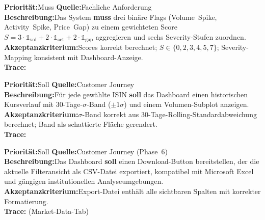\documentclass[11pt, a4paper, oneside, openany]{report}
\newcommand{\code}[1]{{\codefont\small\textcolor{DeepNavy}{#1}}}
\begin{document}
\vspace{6pt}

\begin{reqbox}
\textbf{Priorität:}\;Muss \quad \textbf{Quelle:}\;Fachliche Anforderung \\[4pt]
\textbf{Beschreibung:}\;Das System \textbf{muss} drei binäre Flags (Volume~Spike, Activity~Spike, Price~Gap) zu einem gewichteten Score $S = 3 \cdot \mathbb{1}_\text{vol} + 2 \cdot \mathbb{1}_\text{act} + 2 \cdot \mathbb{1}_\text{gap}$ aggregieren und sechs Severity-Stufen zuordnen. \\[4pt]
\textbf{Akzeptanzkriterium:}\;Scores korrekt berechnet; $S \in \{0,2,3,4,5,7\}$; Severity-Mapping konsistent mit Dashboard-Anzeige. \\[4pt]
\textbf{Trace:}\;\code{backend/operations/metrics.py :: compute\_anomaly\_flags()}
\end{reqbox}

\vspace{6pt}

\begin{reqbox}
\textbf{Priorität:}\;Soll \quad \textbf{Quelle:}\;Customer Journey \\[4pt]
\textbf{Beschreibung:}\;Für jede gewählte ISIN \textbf{soll} das Dashboard einen historischen Kursverlauf mit 30-Tage-$\sigma$-Band ($\pm 1\sigma$) und einem Volumen-Subplot anzeigen. \\[4pt]
\textbf{Akzeptanzkriterium:}\;$\sigma$-Band korrekt aus 30-Tage-Rolling-Standardabweichung berechnet; Band als schattierte Fläche gerendert. \\[4pt]
\textbf{Trace:}\;\code{frontend/operations/charts.py :: chart\_security\_history()}
\end{reqbox}

\vspace{6pt}

\begin{reqbox}
\textbf{Priorität:}\;Soll \quad \textbf{Quelle:}\;Customer Journey (Phase~6) \\[4pt]
\textbf{Beschreibung:}\;Das Dashboard \textbf{soll} einen Download-Button bereitstellen, der die aktuelle Filteransicht als CSV-Datei exportiert, kompatibel mit Microsoft Excel und gängigen institutionellen Analyseumgebungen. \\[4pt]
\textbf{Akzeptanzkriterium:}\;Export-Datei enthält alle sichtbaren Spalten mit korrekter Formatierung. \\[4pt]
\textbf{Trace:}\;\code{frontend/app.py} (Market-Data-Tab)
\end{reqbox}
\end{document}
